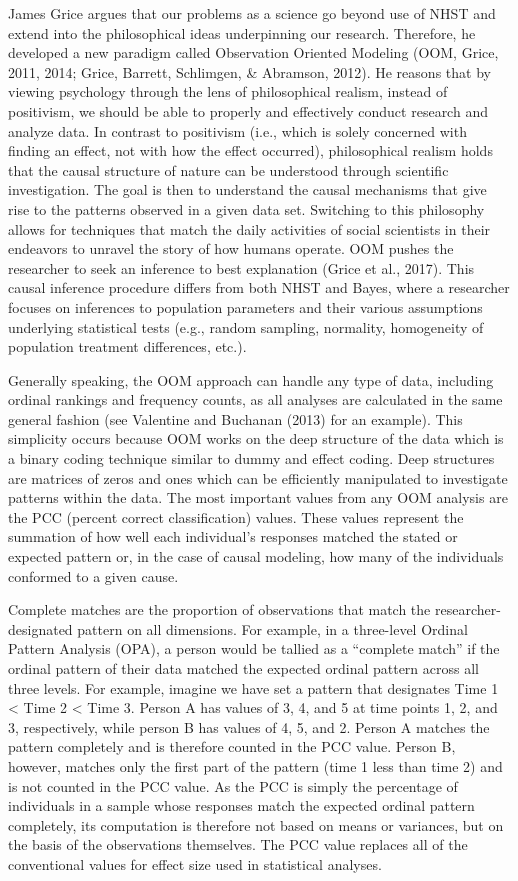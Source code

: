 \documentclass[,man, mask]{apa6}
\theoremstyle{definition}
\theoremstyle{definition}
\theoremstyle{definition}
\theoremstyle{remark}
\begin{document}
James Grice argues that our problems as a science go beyond use of NHST
and extend into the philosophical ideas underpinning our research.
Therefore, he developed a new paradigm called Observation Oriented
Modeling (OOM, Grice, 2011, 2014; Grice, Barrett, Schlimgen, \&
Abramson, 2012). He reasons that by viewing psychology through the lens
of philosophical realism, instead of positivism, we should be able to
properly and effectively conduct research and analyze data. In contrast
to positivism (i.e., which is solely concerned with finding an effect,
not with how the effect occurred), philosophical realism holds that the
causal structure of nature can be understood through scientific
investigation. The goal is then to understand the causal mechanisms that
give rise to the patterns observed in a given data set. Switching to
this philosophy allows for techniques that match the daily activities of
social scientists in their endeavors to unravel the story of how humans
operate. OOM pushes the researcher to seek an inference to best
explanation (Grice et al., 2017). This causal inference procedure
differs from both NHST and Bayes, where a researcher focuses on
inferences to population parameters and their various assumptions
underlying statistical tests (e.g., random sampling, normality,
homogeneity of population treatment differences, etc.).

Generally speaking, the OOM approach can handle any type of data,
including ordinal rankings and frequency counts, as all analyses are
calculated in the same general fashion (see Valentine and Buchanan
(2013) for an example). This simplicity occurs because OOM works on the
deep structure of the data which is a binary coding technique similar to
dummy and effect coding. Deep structures are matrices of zeros and ones
which can be efficiently manipulated to investigate patterns within the
data. The most important values from any OOM analysis are the PCC
(percent correct classification) values. These values represent the
summation of how well each individual's responses matched the stated or
expected pattern or, in the case of causal modeling, how many of the
individuals conformed to a given cause.

Complete matches are the proportion of observations that match the
researcher-designated pattern on all dimensions. For example, in a
three-level Ordinal Pattern Analysis (OPA), a person would be tallied as
a \enquote{complete match} if the ordinal pattern of their data matched
the expected ordinal pattern across all three levels. For example,
imagine we have set a pattern that designates Time 1 \textless{} Time 2
\textless{} Time 3. Person A has values of 3, 4, and 5 at time points 1,
2, and 3, respectively, while person B has values of 4, 5, and 2. Person
A matches the pattern completely and is therefore counted in the PCC
value. Person B, however, matches only the first part of the pattern
(time 1 less than time 2) and is not counted in the PCC value. As the
PCC is simply the percentage of individuals in a sample whose responses
match the expected ordinal pattern completely, its computation is
therefore not based on means or variances, but on the basis of the
observations themselves. The PCC value replaces all of the conventional
values for effect size used in statistical analyses.
\end{document}
